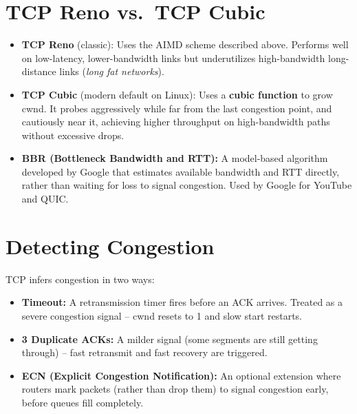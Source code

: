 \documentclass[11pt, letterpaper]{article}
\begin{document}
\section*{TCP Reno vs.\ TCP Cubic}

\begin{itemize}[noitemsep]
  \item \textbf{TCP Reno} (classic): Uses the AIMD scheme described above. Performs well on low-latency, lower-bandwidth links but underutilizes high-bandwidth long-distance links (\emph{long fat networks}).
  \item \textbf{TCP Cubic} (modern default on Linux): Uses a \textbf{cubic function} to grow cwnd. It probes aggressively while far from the last congestion point, and cautiously near it, achieving higher throughput on high-bandwidth paths without excessive drops.
  \item \textbf{BBR (Bottleneck Bandwidth and RTT):} A model-based algorithm developed by Google that estimates available bandwidth and RTT directly, rather than waiting for loss to signal congestion. Used by Google for YouTube and QUIC.
\end{itemize}

\section*{Detecting Congestion}

TCP infers congestion in two ways:
\begin{itemize}[noitemsep]
  \item \textbf{Timeout:} A retransmission timer fires before an ACK arrives. Treated as a severe congestion signal -- cwnd resets to 1 and slow start restarts.
  \item \textbf{3 Duplicate ACKs:} A milder signal (some segments are still getting through) -- fast retransmit and fast recovery are triggered.
  \item \textbf{ECN (Explicit Congestion Notification):} An optional extension where routers mark packets (rather than drop them) to signal congestion early, before queues fill completely.
\end{itemize}

\newpage
\end{document}
